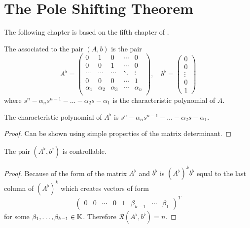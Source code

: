 \chapter{The Pole Shifting Theorem}

The following chapter is based on the fifth chapter of \cite{Sontag1998}.

\begin{definition}
    The  associated to the pair $(A,b)$ is the pair 
    \begin{equation*}
        A^\flat=
        \begin{pmatrix}
            0 & 1 & 0 & \cdots & 0 \\
            0 & 0 & 1 & \cdots & 0 \\
            \cdots & \cdots & \cdots & \ddots & \vdots \\
            0 & 0 & 0 & \cdots & 1 \\
            \alpha_1 & \alpha_2 & \alpha_3 & \cdots & \alpha_n \\
        \end{pmatrix},
        \quad
        b^\flat=
        \begin{pmatrix}
            0 \\
            0 \\
            \vdots \\
            0 \\
            1
        \end{pmatrix}
    \end{equation*}
    where $s^n-\alpha_ns^{n-1}-\ldots-\alpha_2s-\alpha_1$ is the characteristic polynomial of $A$.
\end{definition}

\begin{lemma}
\label{lem:flatCharPol}
    The characteristic polynomial of $A^\flat$ is $s^n-\alpha_ns^{n-1}-\ldots-\alpha_2s-\alpha_1$.
\end{lemma}

\begin{proof}
    Can be shown using simple properties of the matrix determinant.
\end{proof}

\begin{lemma}
\label{lem:flatControllable}
    The pair $(A^\flat,b^\flat)$ is controllable.
\end{lemma}

\begin{proof}
    Because of the form of the matrix $A^\flat$ and $b^\flat$ is $(A^\flat)^kb^\flat$ equal to the last column of $(A^\flat)^k$ which creates vectors of form 
    \begin{equation*}
        \begin{pmatrix}
            0 &
            0 &
            \cdots &
            0 &
            1 &
            \beta_{k-1} &
            \cdots &
            \beta_1
        \end{pmatrix}^T
    \end{equation*}
    for some $\beta_1,\ldots,\beta_{k-1}\in\mathbb{K}$. Therefore $\mathcal{R}(A^\flat,b^\flat)=n$.
\end{proof}

